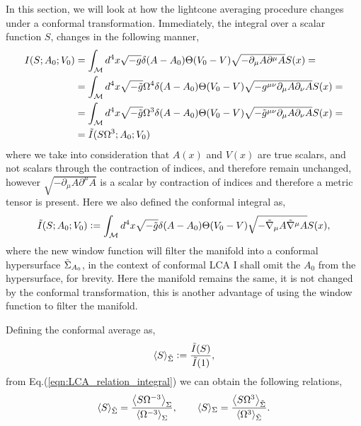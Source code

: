 In this section, we will look at how the lightcone averaging procedure changes under a conformal transformation. Immediately, the integral over a scalar function $S$, changes in the following manner,
\begin{align}
    I(S;A_0;V_0)&=\int_{\mathcal{M}}d^4x \sqrt{-g} \delta(A-A_0)\Theta(V_0-V)\sqrt{-\partial_\mu A\partial^\mu A}S(x)=\nonumber\\
    &=\int_{\mathcal{M}}d^4x \sqrt{-\Tilde{g}}\Omega^4 \delta(A-A_0)\Theta(V_0-V)\sqrt{-g^{\mu\nu}\partial_\mu A\partial_\nu A}S(x)=\nonumber\\
    &=\int_{\mathcal{M}}d^4x \sqrt{-\Tilde{g}}\Omega^3 \delta(A-A_0)\Theta(V_0-V)\sqrt{-\Tilde{g}^{\mu\nu}\partial_\mu A\partial_\nu A}S(x)=\nonumber\\
    &=\Tilde{I}(S\Omega^3;A_0;V_0)
    \label{eqn:LCA_relation_integral}
\end{align}
where we take into consideration that $A(x)$ and $V(x)$ are true scalars, and not scalars through the contraction of indices, and therefore remain unchanged, however $\sqrt{-\partial_\mu A\partial^\mu A}$ is a scalar by contraction of indices and therefore a metric tensor is present. Here we also defined the conformal integral as,
\begin{equation}
    \Tilde{I}(S;A_0;V_0) := \int_{\mathcal{M}}d^4x \sqrt{-\Tilde{g}} \delta(A-A_0)\Theta(V_0-V)\sqrt{-\Tilde{\nabla}_\mu A\Tilde{\nabla}^\mu A}S(x),
\end{equation}
where the new window function will filter the manifold into a conformal hypersurface $\Tilde{\Sigma}_{A_0}$, in the context of conformal LCA I shall omit the $A_0$ from the hypersurface, for brevity. Here the manifold remains the same, it is not changed by the conformal transformation, this is another advantage of using the window function to filter the manifold.

Defining the conformal average as,
\begin{equation}
    \langle S \rangle_{\Tilde{\Sigma}}:= \frac{\Tilde{I}(S)}{\Tilde{I}(1)},
\end{equation}
from Eq.(\ref{eqn:LCA_relation_integral}) we can obtain the following relations,
\begin{equation}
    \langle S\rangle_{\Tilde{\Sigma}}=\frac{\left\langle S\Omega^{-3}\right\rangle_{\Sigma}}{\left\langle \Omega^{-3}\right\rangle_{\Sigma}}, \qquad \langle S\rangle_{\Sigma}=\frac{\left\langle S\Omega^{3}\right\rangle_{\Tilde{\Sigma}}}{\left\langle \Omega^{3}\right\rangle_{\Tilde{\Sigma}}}.
    \label{eqn:LCA_relation_averages}
\end{equation}

